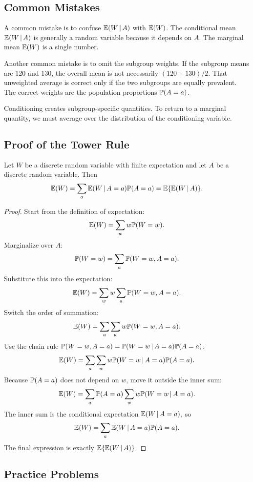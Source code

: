 \subsection{Common Mistakes}

A common mistake is to confuse $\mathbb{E}(W\,\vert\, A)$ with $\mathbb{E}(W)$. The conditional mean $\mathbb{E}(W\,\vert\, A)$ is generally a random variable because it depends on $A$. The marginal mean $\mathbb{E}(W)$ is a single number.

Another common mistake is to omit the subgroup weights. If the subgroup means are 120 and 130, the overall mean is not necessarily $(120+130)/2$. That unweighted average is correct only if the two subgroups are equally prevalent. The correct weights are the population proportions $\mathbb{P}(A=a)$.

\begin{remark}
Conditioning creates subgroup-specific quantities. To return to a marginal quantity, we must average over the distribution of the conditioning variable.
\end{remark}

\subsection{Proof of the Tower Rule}

\begin{theorem}
Let $W$ be a discrete random variable with finite expectation and let $A$ be a discrete random variable. Then
\[
\mathbb{E}(W)=\sum_a \mathbb{E}(W\,\vert\, A=a)\mathbb{P}(A=a)
=\mathbb{E}\{\mathbb{E}(W\,\vert\, A)\}.
\]
\end{theorem}

\begin{proof}
Start from the definition of expectation:
\[
\mathbb{E}(W)=\sum_w w\mathbb{P}(W=w).
\]
Marginalize over $A$:
\[
\mathbb{P}(W=w)=\sum_a \mathbb{P}(W=w,A=a).
\]
Substitute this into the expectation:
\[
\mathbb{E}(W)
=\sum_w w\sum_a \mathbb{P}(W=w,A=a).
\]
Switch the order of summation:
\[
\mathbb{E}(W)
=\sum_a\sum_w w\mathbb{P}(W=w,A=a).
\]
Use the chain rule $\mathbb{P}(W=w,A=a)=\mathbb{P}(W=w\,\vert\, A=a)\mathbb{P}(A=a)$:
\[
\mathbb{E}(W)
=\sum_a\sum_w w\mathbb{P}(W=w\,\vert\, A=a)\mathbb{P}(A=a).
\]
Because $\mathbb{P}(A=a)$ does not depend on $w$, move it outside the inner sum:
\[
\mathbb{E}(W)
=\sum_a \mathbb{P}(A=a)\sum_w w\mathbb{P}(W=w\,\vert\, A=a).
\]
The inner sum is the conditional expectation $\mathbb{E}(W\,\vert\, A=a)$, so
\[
\mathbb{E}(W)=\sum_a \mathbb{E}(W\,\vert\, A=a)\mathbb{P}(A=a).
\]
The final expression is exactly $\mathbb{E}\{\mathbb{E}(W\,\vert\, A)\}$.
\end{proof}

\subsection{Practice Problems}

